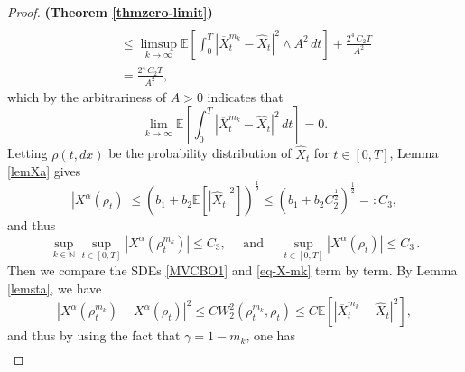 \documentclass{ims9x6}
\newcommand{\EE}{\mathbb{E}}
\newcommand{\RR}{\mathbb{R}}
\newcommand{\NN}{\mathbb{N}}
\newcommand{\OX}{\overline{X}}
\begin{document}
\begin{proof}{\textbf{(Theorem \ref{thmzero-limit})}}
\begin{align}
	\nonumber
	\\
	&\quad\leq
	\limsup_{k\rightarrow \infty}\EE\left[\int_0^T |\OX_t^{m_k}-\widehat X_t|^2 \wedge A^2\,dt \right]
	+  \frac{2^4 \, C_2 T}{A^2}
	\nonumber
	\\
	&\quad= \frac{2^4 \, C_2 T}{A^2}, \nonumber
	\end{align}
	which by the arbitrariness of $A>0$ indicates that 
	\begin{equation} \label{limit-zero}
	\lim_{k\rightarrow \infty}\EE\left[\int_0^T |\OX_t^{m_k}-\widehat X_t|^2\,dt \right] 
	=0.
	\end{equation}
	Letting $\rho(t,dx)$  be the probability distribution of $\widehat X_t$ for $t\in[0,T]$, Lemma \ref{lemXa} gives
	$$
	|{X}^{\alpha}(\rho_t)|\leq (b_1+b_2\EE[|\widehat X_t|^2])^{\frac{1}{2}} \leq (b_1+b_2C_2^{\frac{1}{2}})^\frac{1}{2}=:C_3,
	$$
	and thus
	\begin{equation}\label{Xalbound}
	\sup_{k\in\mathbb N} \sup_{t\in[0,T]}|{X}^{\alpha}(\rho_t^{m_k})|\leq  C_3, \quad \text{ and }\quad
	\sup_{t\in[0,T]} |{X}^{\alpha}(\rho_t)|\leq  C_3\,.
	\end{equation}	
	Then we compare the SDEs \eqref{MVCBO1} and \eqref{eq-X-mk} term by term. By Lemma \ref{lemsta}, we have
	\begin{equation*}
	|X^{\alpha}(\rho_t^{m_k})-X^\alpha( \rho_t)|^2\leq C W_2^2(\rho_t^{m_k}, \rho_t)\leq C \EE[|\OX_t^{m_k}-\widehat X_t|^2],
	\end{equation*}
	and thus by using the fact that  $\gamma=1-m_k$, one has
{\small  \begin{align}

\end{align}}
\end{proof}
\end{document}
